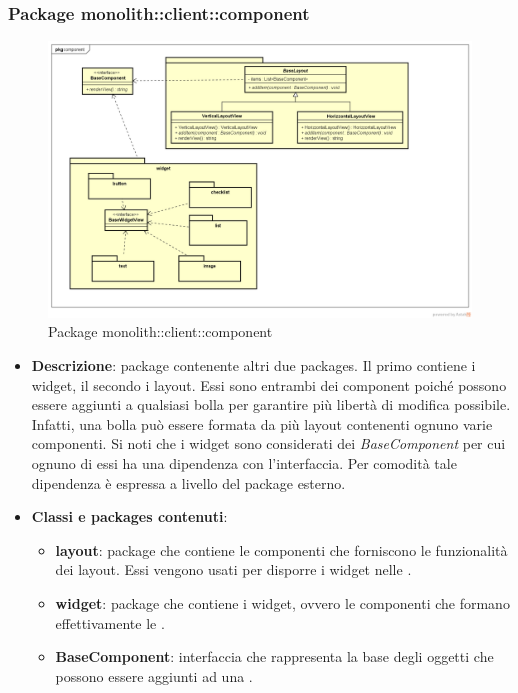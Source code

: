 \subsubsection{Package monolith::client::component}
\label{Package monolith::client::component}
\begin{figure}[H]
	\centering
	\includegraphics[scale=0.5]{Sezioni/Packages/SDK/component.png}
	\caption{Package monolith::client::component}
\end{figure}

\begin{itemize}
\item \textbf{Descrizione}: package contenente altri due packages. Il primo contiene i widget, il secondo i layout. Essi sono entrambi dei component poiché possono essere aggiunti a qualsiasi bolla per garantire più libertà di modifica possibile. Infatti, una bolla può essere formata da più layout contenenti ognuno varie componenti.
Si noti che i widget sono considerati dei \textit{BaseComponent} per cui ognuno di essi ha una dipendenza con l'interfaccia. Per comodità tale dipendenza è espressa a livello del package esterno.
\item \textbf{Classi e packages contenuti}:
\begin{itemize}
\item \textbf{layout}: package che contiene le componenti che forniscono le funzionalità dei layout. Essi vengono usati per disporre i widget nelle .
\item \textbf{widget}: package che contiene i widget, ovvero le componenti che formano effettivamente le .
\item \textbf{BaseComponent}: interfaccia che rappresenta la base degli oggetti che possono essere aggiunti ad una .
\end{itemize}
\end{itemize}

